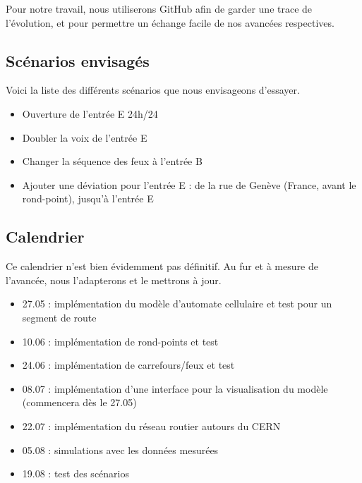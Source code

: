 \documentclass[a4paper,10pt]{extarticle}
\begin{document}
Pour notre travail, nous utiliserons GitHub afin de garder une trace de l'évolution, et pour permettre un échange facile de nos avancées respectives.

\subsection*{Scénarios envisagés}

Voici la liste des différents scénarios que nous envisageons d'essayer.

\begin{itemize}
\item Ouverture de l'entrée E 24h/24
\item Doubler la voix de l'entrée E
\item Changer la séquence des feux à l'entrée B
\item Ajouter une déviation pour l'entrée E : de la rue de Genève (France, avant le rond-point), jusqu'à l'entrée E
\end{itemize}

\subsection*{Calendrier}

Ce calendrier n'est bien évidemment pas définitif. Au fur et à mesure de l'avancée, nous l'adapterons et le mettrons à jour.

\begin{itemize}
\item 27.05 : implémentation du modèle d'automate cellulaire et test pour un segment de route
\item 10.06 : implémentation de rond-points et test
\item 24.06 : implémentation de carrefours/feux et test
\item 08.07 : implémentation d'une interface pour la visualisation du modèle (commencera dès le 27.05)
\item 22.07 : implémentation du réseau routier autours du CERN
\item 05.08 : simulations avec les données mesurées
\item 19.08 : test des scénarios
\end{itemize}
\end{document}
